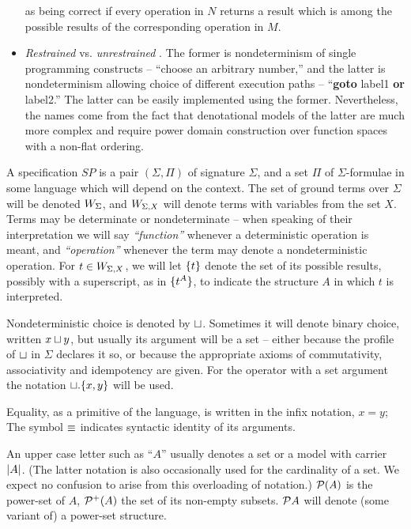 \begin{itemize}
 as being correct if every operation in $N$ returns a result which 
is among the possible results of the corresponding operation in 
$M$.  
\item {\em Restrained} vs. {\em unrestrained }\cite{c:110}. 
The former is nondeterminism of single programming constructs 
 -- ``choose an arbitrary number,'' and the 
latter is nondeterminism allowing choice of different execution 
paths  -- ``{\bf goto} label1 {\bf or} 
label2.'' The latter can be easily implemented using the former. 
Nevertheless, the names come from the fact that denotational models 
of the latter are much more complex and require power domain 
construction over function spaces with a non-flat ordering.  
\end{itemize}

 A specification $SP$ is a pair $(\Sigma,\Pi)$ of 
signature $\Sigma$, and a set $\Pi$ of $\Sigma$-formulae in some language which will depend on the 
context. The set of ground terms over $\Sigma$
 will be denoted $W_{\Sigma}$, and $W_{{\Sigma,X}}$ will denote terms with 
 variables from the set $X$. Terms may be determinate or nondeterminate 
 -- when speaking of their interpretation we will say {\em 
``function'' } whenever a deterministic operation is 
meant, and {\em ``operation''} whenever the term may 
denote a nondeterministic operation. For $t\in W_{{\Sigma,X}}$, we will 
let $\{t\}$ denote the set 
of its possible results, possibly with a superscript, as in 
$\{t^{A}\}$,  to indicate the structure $A$ in which $t$
 is interpreted. 

Nondeterministic choice is 
denoted by $\sqcup$. Sometimes it will denote binary 
choice, written  $x\sqcup y$, but usually its argument will be a set 
 -- either because the profile of $\sqcup$ in $\Sigma$ declares it 
so, or because the appropriate axioms of commutativity, associativity 
and idempotency are given. For the  operator with a set argument the notation 
$\sqcup.\{x,y\}$ will be used. 

Equality, as a primitive of the language, is written in the infix 
notation,  $x=y$; 
The symbol $\mathrel{\equiv}$  indicates syntactic identity of its arguments. 
 
 
An upper case letter such as ``$A$''  usually 
denotes a set or a model with carrier $|A|$. 
(The latter notation is also occasionally used for the cardinality 
of a set. We expect  no confusion to arise from this overloading of 
notation.) 
${\cal P}(A)$ is the power-set of $A$,  ${\cal P}^{+}(A)$ the set of its 
non-empty subsets.  ${\cal P} A$ will denote (some variant of) a power-set 
structure. 

